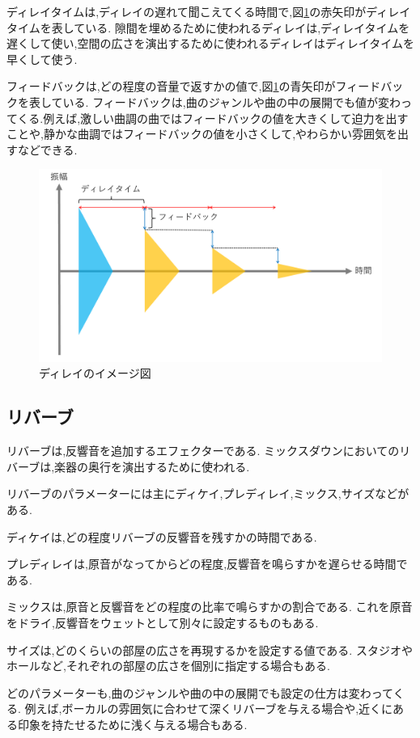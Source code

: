 \documentclass[12pt,a4j,titlepage]{ltjsarticle}
\begin{document}
ディレイタイムは,ディレイの遅れて聞こえてくる時間で,図\ref{fig:delay}の赤矢印がディレイタイムを表している.
隙間を埋めるために使われるディレイは,ディレイタイムを遅くして使い,空間の広さを演出するために使われるディレイはディレイタイムを早くして使う.

フィードバックは,どの程度の音量で返すかの値で,図\ref{fig:delay}の青矢印がフィードバックを表している.
フィードバックは,曲のジャンルや曲の中の展開でも値が変わってくる.例えば,激しい曲調の曲ではフィードバックの値を大きくして迫力を出すことや,静かな曲調ではフィードバックの値を小さくして,やわらかい雰囲気を出すなどできる.

\begin{figure}[H]
\centering
 \includegraphics[width=120mm]{./figures/delay.pdf}
 \caption{ディレイのイメージ図}
 \label{fig:delay}
\end{figure}


\subsection{リバーブ}
リバーブは,反響音を追加するエフェクターである.
ミックスダウンにおいてのリバーブは,楽器の奥行を演出するために使われる.

リバーブのパラメーターには主にディケイ,プレディレイ,ミックス,サイズなどがある.

ディケイは,どの程度リバーブの反響音を残すかの時間である.

プレディレイは,原音がなってからどの程度,反響音を鳴らすかを遅らせる時間である.

ミックスは,原音と反響音をどの程度の比率で鳴らすかの割合である.
これを原音をドライ,反響音をウェットとして別々に設定するものもある.

サイズは,どのくらいの部屋の広さを再現するかを設定する値である.
スタジオやホールなど,それぞれの部屋の広さを個別に指定する場合もある.

どのパラメーターも,曲のジャンルや曲の中の展開でも設定の仕方は変わってくる.
例えば,ボーカルの雰囲気に合わせて深くリバーブを与える場合や,近くにある印象を持たせるために浅く与える場合もある.
\end{document}
